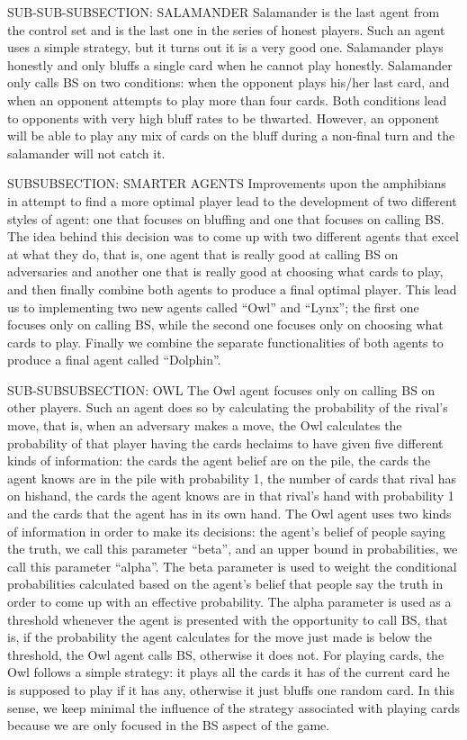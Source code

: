 \documentclass[a4paper,12pt]{article}
\begin{document}
	SUB-SUB-SUBSECTION: SALAMANDER
	Salamander is the last agent from the control set and is the last one in the series of honest players. Such an agent uses a simple strategy, but it turns out it is a very good one. Salamander plays honestly and only bluffs a single card when he cannot play honestly. Salamander only calls BS on two conditions: when the opponent plays his/her last card, and when an opponent attempts to play more than four cards. Both conditions lead to opponents with very high bluff rates to be thwarted. However, an opponent will be able to play any mix of cards on the bluff during a non-final turn and the salamander will not catch it. 
		
SUBSUBSECTION: SMARTER AGENTS
	Improvements upon the amphibians in attempt to find a more optimal player lead to the development of two different styles of agent: one that focuses on bluffing and one that focuses on calling BS. The idea behind this decision was to come up with two different agents that excel at what they do, that is, one agent that is really good at calling BS on adversaries and another one that is really good at choosing what cards to play, and then finally combine both agents to produce a final optimal player. This lead us to implementing two new agents called “Owl” and “Lynx”; the first one focuses only on calling BS, while the second one focuses only on choosing what cards to play. Finally we combine the separate functionalities of both agents to produce a final agent called “Dolphin”.

	SUB-SUBSUBSECTION: OWL
	The Owl agent focuses only on calling BS on other players. Such an agent does so by calculating the probability of the rival’s move, that is, when an adversary makes a move, the Owl calculates the probability of that player having the cards he\she claims to have given five different kinds of information: the cards the agent belief are on the pile, the cards the agent knows are in the pile with probability 1, the number of cards that rival has on his\her hand, the cards the agent knows are in that rival’s hand with probability 1 and the cards that the agent has in its own hand. The Owl agent uses two kinds of information in order to make its decisions: the agent’s belief of people saying the truth, we call this parameter “beta”, and an upper bound in probabilities, we call this parameter “alpha”. The beta parameter is used to weight the conditional probabilities calculated based on the agent’s belief that people say the truth in order to come up with an effective probability. The alpha parameter is used as a threshold whenever the agent is presented with the opportunity to call BS, that is, if the probability the agent calculates for the move just made is below the threshold, the Owl agent calls BS, otherwise it does not. For playing cards, the Owl follows a simple strategy: it plays all the cards it has of the current card he is supposed to play if it has any, otherwise it just bluffs one random card. In this sense, we keep minimal the influence of the strategy associated with playing cards because we are only focused in the BS aspect of the game.
\end{document}
